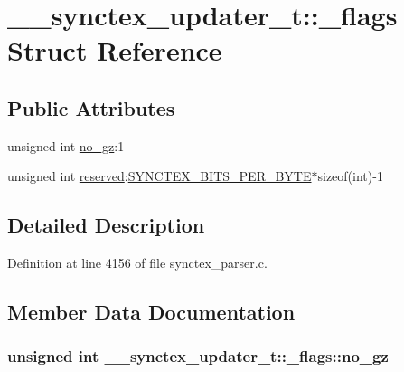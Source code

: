 \hypertarget{struct____synctex__updater__t_1_1__flags}{\section{\+\_\+\+\_\+synctex\+\_\+updater\+\_\+t\+:\+:\+\_\+flags Struct Reference}
\label{struct____synctex__updater__t_1_1__flags}
}
\subsection*{Public Attributes}
\begin{DoxyCompactItemize}
\item 
unsigned int \hyperlink{struct____synctex__updater__t_1_1__flags_a7f827bf39798bea0e45acf68573b038d}{no\+\_\+gz}\+:1
\item 
unsigned int \hyperlink{struct____synctex__updater__t_1_1__flags_aa2305297befe75aa440a913f1814af30}{reserved}\+:\hyperlink{synctex__parser_8c_a9ecbbb567720f18ab606c137cf641148}{S\+Y\+N\+C\+T\+E\+X\+\_\+\+B\+I\+T\+S\+\_\+\+P\+E\+R\+\_\+\+B\+Y\+T\+E}$\ast$sizeof(int)-\/1
\end{DoxyCompactItemize}


\subsection{Detailed Description}


Definition at line 4156 of file synctex\+\_\+parser.\+c.



\subsection{Member Data Documentation}
\hypertarget{struct____synctex__updater__t_1_1__flags_a7f827bf39798bea0e45acf68573b038d}{
\subsubsection[{no\+\_\+gz}]{\setlength{\rightskip}{0pt plus 5cm}unsigned int \+\_\+\+\_\+synctex\+\_\+updater\+\_\+t\+::\+\_\+flags\+::no\+\_\+gz}}\label{struct____synctex__updater__t_1_1__flags_a7f827bf39798bea0e45acf68573b038d}


